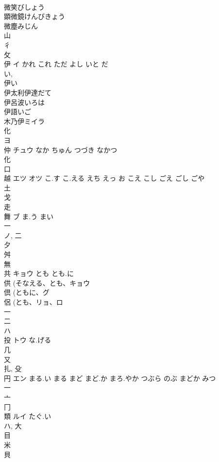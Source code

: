 \documentclass[8pt]{extreport}
\begin{document}
\begin{CJK}{UTF8}{min}
\\	微笑びしょう 
\\	顕微鏡けんびきょう 
\\	微塵みじん 
\\	山 
\\	彳 
\\	攵 
\\	伊	イ	かれ これ ただ よし いと だ	
\\	い, 
\\	伊い
\\	伊太利伊達だて
\\	伊呂波いろは
\\	伊語いご
\\	木乃伊ミイラ
\\	化 
\\	ヨ	
\\	仲	チュウ	なか ちゅん つづき なかつ	
\\	化 
\\	口 
\\	越	エツ オツ	こ.す こ.える えち えっ お こえ こし ごえ ごし ごや	
\\	土 
\\	戈 
\\	走 
\\	舞	ブ	ま.う まい	
\\	一 
\\	ノ, 二 
\\	夕 
\\	舛 
\\	無 
\\	共	キョウ	とも とも.に	
\\	供 (そなえる、とも、キョウ 
\\	倶 (ともに、グ 
\\	侶 (とも、リョ、ロ 
\\	一 
\\	二 
\\	ハ	
\\	投	トウ	な.げる	
\\	几 
\\	又 
\\	扎, 殳 
\\	円	エン	まる.い まる まど まど.か まろ.やか つぶら のぶ まどか みつ	
\\	一 
\\	亠 
\\	冂 
\\	類	ルイ	たぐ.い	
\\	ハ, 大 
\\	目 
\\	米 
\\	貝 

\end{CJK}
\end{document}
